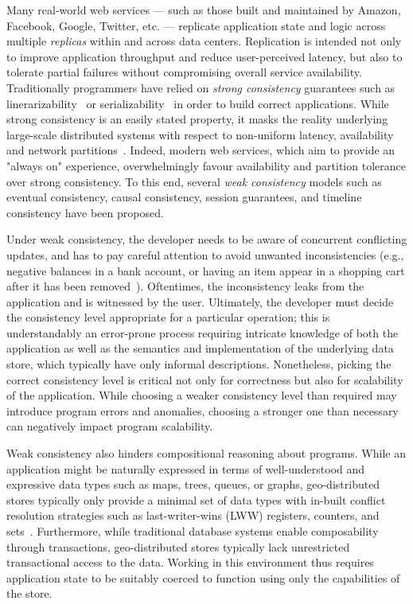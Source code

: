 Many real-world web services --- such as those built and maintained by Amazon,
Facebook, Google, Twitter, etc. --- replicate application state and logic
across multiple \emph{replicas} within and across data centers. Replication is
intended not only to improve application throughput and reduce user-perceived
latency, but also to tolerate partial failures without compromising overall
service availability. Traditionally programmers have relied on \emph{strong
consistency} guarantees such as linerarizability~\cite{Herlihy1990} or
serializability~\cite{Serializability} in order to build correct applications.
While strong consistency is an easily stated property, it masks the reality
underlying large-scale distributed systems with respect to non-uniform latency,
availability and network partitions~\cite{Brewer2000,Gilbert2002}. Indeed,
modern web services, which aim to provide an "always on" experience,
overwhelmingly favour availability and partition tolerance over strong
consistency. To this end, several \emph{weak consistency} models such as
eventual consistency, causal consistency, session guarantees, and timeline
consistency have been proposed.

Under weak consistency, the developer needs to be aware of concurrent
conflicting updates, and has to pay careful attention to avoid unwanted
inconsistencies (e.g., negative balances in a bank account, or having an item
appear in a shopping cart after it has been removed~\cite{DeCandia2007}).
Oftentimes, the inconsistency leaks from the application and is witnessed by
the user. Ultimately, the developer must decide the consistency level
appropriate for a particular operation; this is understandably an error-prone
process requiring intricate knowledge of both the application as well as the
semantics and implementation of the underlying data store, which typically have
only informal descriptions. Nonetheless, picking the correct consistency level
is critical not only for correctness but also for scalability of the
application. While choosing a weaker consistency level than required may
introduce program errors and anomalies, choosing a stronger one than necessary
can negatively impact program scalability.

Weak consistency also hinders compositional reasoning about programs.  While an
application might be naturally expressed in terms of well-understood and
expressive data types such as maps, trees, queues, or graphs, geo-distributed
stores typically only provide a minimal set of data types with in-built
conflict resolution strategies such as last-writer-wins (LWW) registers,
counters, and sets~\cite{Lakshman2010,DynamoDB}.  Furthermore, while
traditional database systems enable composability through transactions,
geo-distributed stores typically lack unrestricted transactional access to the
data.  Working in this environment thus requires application state to be
suitably coerced to function using only the capabilities of the store.

